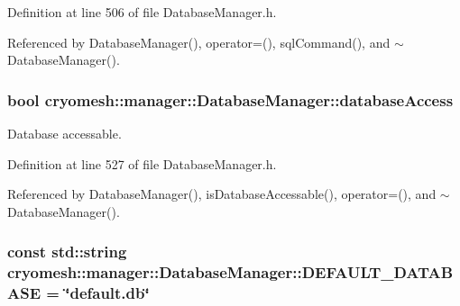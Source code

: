 \-Definition at line 506 of file \-Database\-Manager.\-h.



\-Referenced by \-Database\-Manager(), operator=(), sql\-Command(), and $\sim$\-Database\-Manager().

\hypertarget{classcryomesh_1_1manager_1_1DatabaseManager_ac09173fec7302858a6c0e4ac2d0f5b5d}{
\subsubsection[{database\-Access}]{\setlength{\rightskip}{0pt plus 5cm}bool {\bf cryomesh\-::manager\-::\-Database\-Manager\-::database\-Access}}}\label{classcryomesh_1_1manager_1_1DatabaseManager_ac09173fec7302858a6c0e4ac2d0f5b5d}


\-Database accessable. 



\-Definition at line 527 of file \-Database\-Manager.\-h.



\-Referenced by \-Database\-Manager(), is\-Database\-Accessable(), operator=(), and $\sim$\-Database\-Manager().

\hypertarget{classcryomesh_1_1manager_1_1DatabaseManager_a83c6bbd218ba8c1b5e7391e60b933fe9}{
\subsubsection[{\-D\-E\-F\-A\-U\-L\-T\-\_\-\-D\-A\-T\-A\-B\-A\-S\-E}]{\setlength{\rightskip}{0pt plus 5cm}const std\-::string {\bf cryomesh\-::manager\-::\-Database\-Manager\-::\-D\-E\-F\-A\-U\-L\-T\-\_\-\-D\-A\-T\-A\-B\-A\-S\-E} = \char`\"{}default.\-db\char`\"{}}}\label{classcryomesh_1_1manager_1_1DatabaseManager_a83c6bbd218ba8c1b5e7391e60b933fe9}


